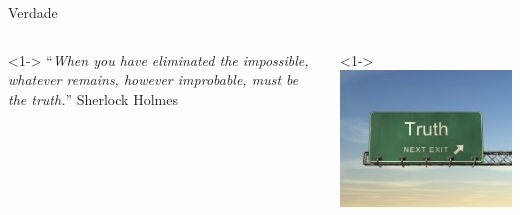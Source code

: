 \documentclass{beamer}
\begin{document}

\begin{frame}{Verdade}
  \begin{columns}
    \begin{column}{6cm}<1-> ``{\em When you have eliminated the
        impossible, whatever remains, however improbable, must be the
        truth.}'' Sherlock Holmes
    \end{column}
    \begin{column}{4cm}<1->
      \includegraphics[height=0.4\textheight]{Intro/truth}
    \end{column}
  \end{columns}
\end{frame}


\end{document}

